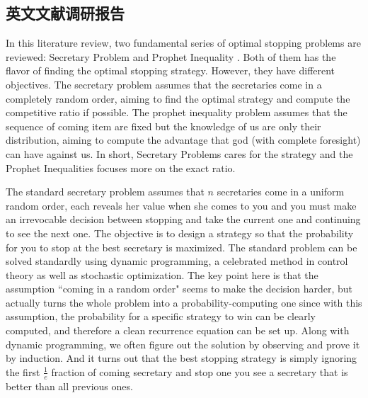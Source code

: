\documentclass[bachelor]{thuthesis}
\begin{document}
\begin{appendix}
\chapter{英文文献调研报告}
\label{cha:engorg}

In this literature review, two fundamental series of optimal stopping problems are reviewed: Secretary Problem \cite{secretary} and Prophet Inequality \cite{prophet}. Both of them has the flavor of finding the optimal stopping strategy. However, they have different objectives. The secretary problem assumes that the secretaries come in a completely random order, aiming to find the optimal strategy and compute the competitive ratio if possible. The prophet inequality problem assumes that the sequence of coming item are fixed but the knowledge of us are only their distribution, aiming to compute the advantage that god (with complete foresight) can have against us. In short, Secretary Problems cares for the strategy and the Prophet Inequalities focuses more on the exact ratio.

The standard secretary problem assumes that $n$ secretaries come in a uniform random order, each reveals her value when she comes to you and you must make an irrevocable decision between stopping and take the current one and continuing to see the next one. The objective is to design a strategy so that the probability for you to stop at the best secretary is maximized. The standard problem can be solved standardly using dynamic programming, a celebrated method in control theory as well as stochastic optimization. The key point here is that the assumption ``coming in a random order" seems to make the decision harder, but actually turns the whole problem into a probability-computing one since with this assumption, the probability for a specific strategy to win can be clearly computed, and therefore a clean recurrence equation can be set up. Along with dynamic programming, we often figure out the solution by observing and prove it by induction. And it turns out that the best stopping strategy is simply ignoring the first $\frac{1}{e}$ fraction of coming secretary and stop one you see a secretary that is better than all previous ones.


\end{appendix}
\end{document}
